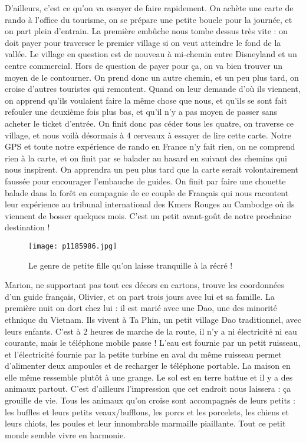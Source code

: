 \documentclass{book}
\begin{document}
D'ailleurs, c'est ce qu'on va essayer de faire rapidement. On achète une carte de rando à l'office du tourisme, on se prépare une petite boucle pour la journée, et on part plein d'entrain. La première embûche nous tombe dessus très vite : on doit payer pour traverser le premier village si on veut atteindre le fond de la vallée. Le village en question est de nouveau à mi-chemin entre Disneyland et un centre commercial. Hors de question de payer pour ça, on va bien trouver un moyen de le contourner. On prend donc un autre chemin, et un peu plus tard, on croise d'autres touristes qui remontent. Quand on leur demande d'où ils viennent, on apprend qu'ils voulaient faire la même chose que nous, et qu'ils se sont fait refouler une deuxième fois plus bas, et qu'il n'y a pas moyen de passer sans acheter le ticket d'entrée. On finit donc pas céder tous les quatre, on traverse ce village, et nous voilà désormais à 4 cerveaux à essayer de lire cette carte. Notre GPS et toute notre expérience de rando en France n'y fait rien, on ne comprend rien à la carte, et on finit par se balader au hasard en suivant des chemins qui nous inspirent. On apprendra un peu plus tard que la carte serait volontairement faussée pour encourager l'embauche de guides. On finit par faire une chouette balade dans la forêt en compagnie de ce couple de Français qui nous racontent leur expérience au tribunal international des Kmers Rouges au Cambodge où ils viennent de bosser quelques mois. C'est un petit avant-goût de notre prochaine destination !


\begin{figure}[h]
\centering
\texttt{[image: p1185986.jpg]}
\caption*{Le genre de petite fille qu'on laisse tranquille à la récré !}
\end{figure}

Marion, ne supportant pas tout ces décors en cartons, trouve les coordonnées d'un guide français, Olivier, et on part trois jours avec lui et sa famille. La première nuit on dort chez lui : il est marié avec une Dao, une des minorité ethnique du Vietnam. Ils vivent à Ta Phin, un petit village Dao traditionnel, avec leurs enfants. C'est à 2 heures de marche de la route, il n'y a ni électricité ni eau courante, mais le téléphone mobile passe ! L'eau est fournie par un petit ruisseau, et l'électricité fournie par la petite turbine en aval du même ruisseau permet d'alimenter deux ampoules et de recharger le téléphone portable. La maison en elle même ressemble plutôt à une grange. Le sol est en terre battue et il y a des animaux partout. C'est d'ailleurs l'impression que cet endroit nous laissera : ça grouille de vie. Tous les animaux qu'on croise sont accompagnés de leurs petits : les buffles et leurs petits veaux/bufflons, les porcs et les porcelets, les chiens et leurs chiots, les poules et leur innombrable marmaille piaillante. Tout ce petit monde semble vivre en harmonie.
\end{document}
